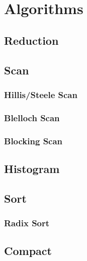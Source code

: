 \documentclass[12px,oz]{report}
\theoremstyle{indented}
\begin{document}
\chapter{Algorithms}
\label{ch:algorithms}


	\section{Reduction}
	\label{sec:al_reduction}
	
	
	\section{Scan}
	\label{sec:al_scan}
	
	
		\subsection{Hillis/Steele Scan}
		\label{sec:al_scan_hillis_steele}
		
		
		\subsection{Blelloch Scan}
		\label{sec:al_scan_blelloch}
		
		
		\subsection{Blocking Scan}
		\label{sec:al_scan_blocking}
		
	
	\section{Histogram}
	\label{sec:al_histogram}
	
	
	\section{Sort}
	\label{sec:al_sort}
	
	
		\subsection{Radix Sort}
		\label{sec:al_sort_radix}
		

	\section{Compact}
	\label{sec-compact}
	
	
\end{document}
